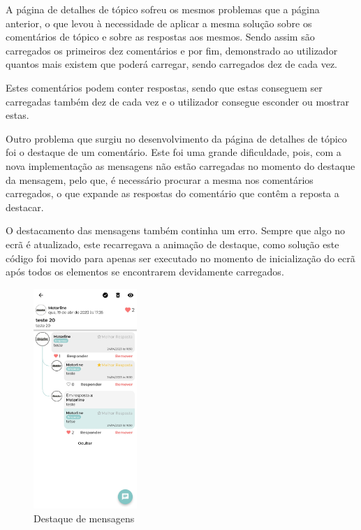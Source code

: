 A página de detalhes de tópico sofreu os mesmos problemas que a página anterior, o que levou à necessidade de aplicar a mesma solução sobre os comentários de tópico e sobre as respostas aos mesmos. Sendo assim são carregados os primeiros dez comentários e por fim, demonstrado ao utilizador quantos mais existem que poderá carregar, sendo carregados dez de cada vez.

Estes comentários podem conter respostas, sendo que estas conseguem ser carregadas também dez de cada vez e o utilizador consegue esconder ou mostrar estas.

Outro problema que surgiu no desenvolvimento da página de detalhes de tópico foi o destaque de um comentário. Este foi uma grande dificuldade, pois, com a nova implementação as mensagens não estão carregadas no momento do destaque da mensagem, pelo que, é necessário procurar a mesma nos comentários carregados, o que expande as respostas do comentário que contêm a reposta a destacar.

O destacamento das mensagens também continha um erro. Sempre que algo no ecrã é atualizado, este recarregava a animação de destaque, como solução este código foi movido para apenas ser executado no momento de inicialização do ecrã após todos os elementos se encontrarem devidamente carregados.

\begin{figure}[htb]
 \centering
 \includegraphics[width=0.35\textwidth]{images/implementacao/frontend/forum/loading_topics/1686062701127.jpg}
 \caption{Destaque de mensagens}
 \label{fig:75}
\end{figure}